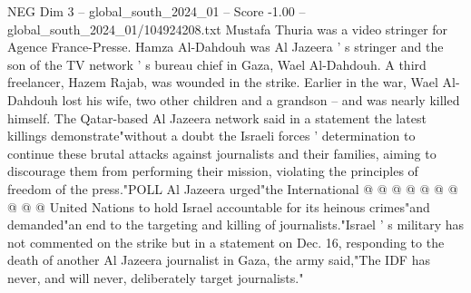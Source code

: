 \begin{textsample}{NEG Dim 3 – global\_south\_2024\_01 – Score -1.00 – global\_south\_2024\_01/104924208.txt}
Mustafa Thuria was a video stringer for Agence France-Presse.
Hamza Al-Dahdouh was Al Jazeera ' s stringer and the son of the TV network ' s bureau chief in Gaza, Wael Al-Dahdouh.
A third freelancer, Hazem Rajab, was wounded in the strike.
Earlier in the war, Wael Al-Dahdouh lost his wife, two other children and a grandson -- and was nearly killed himself.
The Qatar-based Al Jazeera network said in a statement the latest killings demonstrate"without a doubt the Israeli forces ' determination to continue these brutal attacks against journalists and their families, aiming to discourage them from performing their mission, violating the principles of freedom of the press."POLL Al Jazeera urged"the International @ @ @ @ @ @ @ @ @ @ United Nations to hold Israel accountable for its heinous crimes"and demanded"an end to the targeting and killing of journalists."Israel ' s military has not commented on the strike but in a statement on Dec. 16, responding to the death of another Al Jazeera journalist in Gaza, the army said,"The IDF has never, and will never, deliberately target journalists."

\end{textsample}
